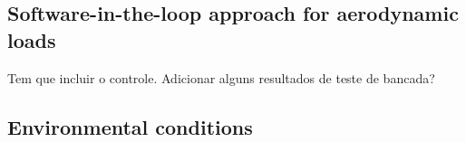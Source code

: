 \subsection{Software-in-the-loop approach for aerodynamic loads}
Tem que incluir o controle. Adicionar alguns resultados de teste de bancada?



\subsection{Environmental conditions} \label{sec:description_experiment:envir}
%
%
%
%

